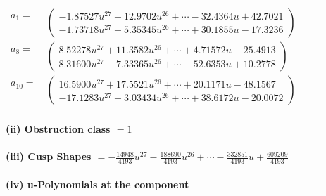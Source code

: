 \documentclass[1p]{elsarticle_modified}
\theoremstyle{definition}
\begin{document}
\begin{tabular}{m{7pt} m{180pt} m{7pt} m{180pt} }
\flushright $a_{1}=$&$\begin{pmatrix}-1.87527 u^{27}-12.9702 u^{26}+\cdots-32.4364 u+42.7021\\-1.73718 u^{27}+5.35345 u^{26}+\cdots+30.1855 u-17.3236\end{pmatrix}$ \\
\flushright $a_{8}=$&$\begin{pmatrix}8.52278 u^{27}+11.3582 u^{26}+\cdots+4.71572 u-25.4913\\8.31600 u^{27}-7.33365 u^{26}+\cdots-52.6353 u+10.2778\end{pmatrix}$ \\
\flushright $a_{10}=$&$\begin{pmatrix}16.5900 u^{27}+17.5521 u^{26}+\cdots+20.1171 u-48.1567\\-17.1283 u^{27}+3.03434 u^{26}+\cdots+38.6172 u-20.0072\end{pmatrix}$\\&\end{tabular}
\flushleft \textbf{(ii) Obstruction class $= 1$}\\~\\
\flushleft \textbf{(iii) Cusp Shapes $= -\frac{14948}{4193} u^{27}-\frac{188690}{4193} u^{26}+\cdots-\frac{332851}{4193} u+\frac{609209}{4193}$}\\~\\
\newpage\renewcommand{\arraystretch}{1}
\flushleft \textbf{(iv) u-Polynomials at the component}\newline \\
\end{document}
